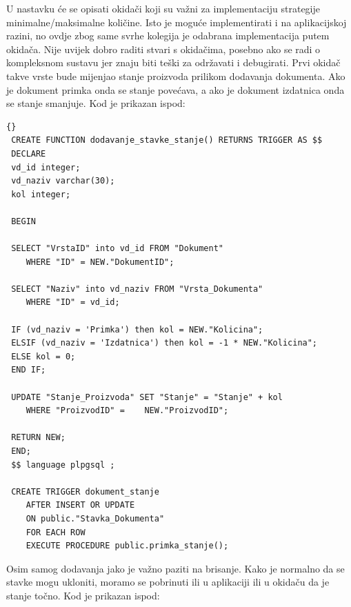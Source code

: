 \documentclass[a4paper,12pt]{foi}
\begin{document}
U nastavku će se opisati okidači koji su važni za implementaciju strategije minimalne/maksimalne količine. Isto je moguće implementirati i na aplikacijskoj razini, no ovdje zbog same svrhe kolegija je odabrana implementacija putem okidača. Nije uvijek dobro raditi stvari s okidačima, posebno ako se radi o kompleksnom sustavu jer znaju biti teški za održavati i debugirati. Prvi okidač takve vrste bude mijenjao stanje proizvoda prilikom dodavanja dokumenta. Ako je dokument primka onda se stanje povećava, a ako je dokument izdatnica onda se stanje smanjuje. Kod je prikazan ispod:

\lstset{commentstyle=\textit,language=SQL}
\begin{lstlisting}[frame=tb]{}
 CREATE FUNCTION dodavanje_stavke_stanje() RETURNS TRIGGER AS $$
 DECLARE
 vd_id integer;
 vd_naziv varchar(30);
 kol integer;

 BEGIN

 SELECT "VrstaID" into vd_id FROM "Dokument" 
 	WHERE "ID" = NEW."DokumentID";
 	
 SELECT "Naziv" into vd_naziv FROM "Vrsta_Dokumenta" 
 	WHERE "ID" = vd_id;

 IF (vd_naziv = 'Primka') then kol = NEW."Kolicina";
 ELSIF (vd_naziv = 'Izdatnica') then kol = -1 * NEW."Kolicina";
 ELSE kol = 0;
 END IF;

 UPDATE "Stanje_Proizvoda" SET "Stanje" = "Stanje" + kol 
 	WHERE "ProizvodID" =    NEW."ProizvodID";

 RETURN NEW;
 END;
 $$ language plpgsql ;

 CREATE TRIGGER dokument_stanje
    AFTER INSERT OR UPDATE 
    ON public."Stavka_Dokumenta"
    FOR EACH ROW
    EXECUTE PROCEDURE public.primka_stanje();
\end{lstlisting}

Osim samog dodavanja jako je važno paziti na brisanje. Kako je normalno da se stavke mogu ukloniti, moramo se pobrinuti ili u aplikaciji ili u okidaču da je stanje točno. Kod je prikazan ispod:
\end{document}
